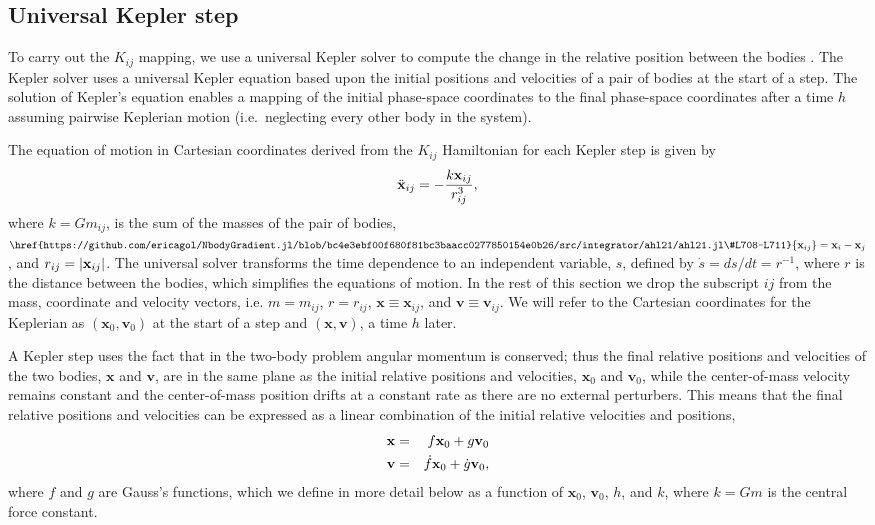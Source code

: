 \documentclass[fleqn,usenatbib,twocolumn]{mnras}
\newcommand   {\change}[1] {{\color{black}{#1}}}
\begin{document}
\subsection{Universal Kepler step}\label{sec:universal_kepler}

To carry out the $K_{ij}$ mapping, we use a universal Kepler solver to compute the change in the relative position between the bodies \citep{Wisdom2015}.
The Kepler solver uses a universal Kepler equation based upon
the initial positions and velocities of a pair of bodies at the start of
a step.  The solution of Kepler's equation enables a mapping of the
initial phase-space coordinates to the final phase-space coordinates
after a time $h$ assuming pairwise Keplerian motion (i.e.\ neglecting
every other body in the system).

The equation of motion in Cartesian coordinates derived from the $K_{ij}$ Hamiltonian for each Kepler step is given by
\begin{eqnarray}\label{eqn:xij}
    \ddot {\bf x}_{ij} = -\frac{k{\bf x}_{ij}}{r_{ij}^3},
\end{eqnarray}
where $k = Gm_{ij}$,
\change{$m_{ij} = m_i + m_j$} is the sum of the masses of the \change{$i$th and $j$th} pair of bodies, $\href{https://github.com/ericagol/NbodyGradient.jl/blob/bc4e3ebf00f680f81bc3baacc0277850154e0b26/src/integrator/ahl21/ahl21.jl\#L708-L711}{{\bf x}_{ij}} = {\bf x}_i - {\bf x}_j$,
and $r_{ij} = \vert {\bf x}_{ij}\vert$.  The universal solver
transforms the time dependence to an independent variable, $s$,
defined by $\dot s = ds/dt = r^{-1}$, where $r$ is the distance between the bodies, which simplifies the equations of motion. In the rest of this section
we drop the subscript $ij$ from the mass, coordinate and velocity vectors, i.e. $m=m_{ij}$, $r=r_{ij}$, $\mathbf{x}\equiv \mathbf{x}_{ij}$, and $\mathbf{v}\equiv \mathbf{v}_{ij}$. We will refer to the Cartesian
coordinates for the Keplerian as $(\mathbf{x}_0,\mathbf{v}_0)$
at the start of a step and $(\mathbf{x},\mathbf{v})$, a time $h$ later.

A Kepler step uses the fact
that in the two-body problem angular momentum is conserved;  thus
the final relative positions and velocities of the two bodies, $\mathbf{x}$
and $\mathbf{v}$, are in the same
plane as the initial relative positions and velocities, $\mathbf{x}_0$
and $\mathbf{v}_0$, while the center-of-mass velocity remains constant and the center-of-mass position drifts at a constant rate as there are no external perturbers.  This means that
the final relative positions and velocities can be expressed as a linear
combination of the initial relative velocities and positions,
\begin{eqnarray}
\mathbf{x} &=& f \mathbf{x}_0 + g \mathbf{v}_0\cr
\mathbf{v} &=& \dot f \mathbf{x}_0 + \dot g \mathbf{v}_0,
\end{eqnarray}
where $f$ and $g$ are Gauss's functions, which we define in
more detail below as a function of $\mathbf{x}_0$,
$\mathbf{v}_0$, $h$, and $k$, where $k=Gm$ is the central
force constant.
\end{document}
